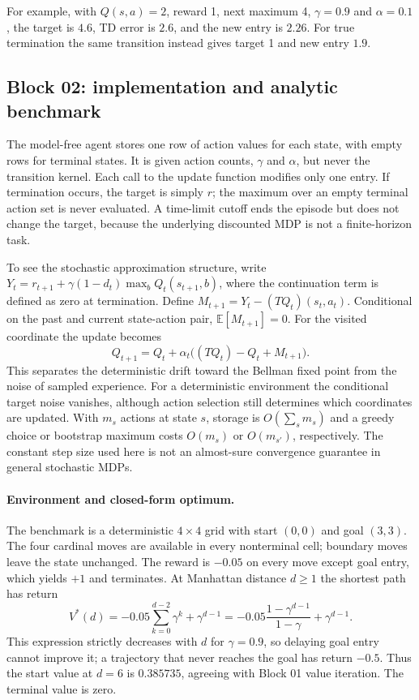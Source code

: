 \documentclass[11pt,a4paper]{article}
\newcommand{\E}{\mathbb E}
\begin{document}
For example, with $Q(s,a)=2$, reward 1, next maximum 4, $\gamma=0.9$ and $\alpha=0.1$, the target is $4.6$, TD error is $2.6$, and the new entry is $2.26$. For true termination the same transition instead gives target 1 and new entry $1.9$.

\subsection{Block 02: implementation and analytic benchmark}
The model-free agent stores one row of action values for each state, with empty rows for terminal states. It is given action counts, $\gamma$ and $\alpha$, but never the transition kernel. Each call to the update function modifies only one entry. If termination occurs, the target is simply $r$; the maximum over an empty terminal action set is never evaluated. A time-limit cutoff ends the episode but does not change the target, because the underlying discounted MDP is not a finite-horizon task.

To see the stochastic approximation structure, write $Y_t=r_{t+1}+\gamma(1-d_t)\max_b Q_t(s_{t+1},b)$, where the continuation term is defined as zero at termination. Define $M_{t+1}=Y_t-(TQ_t)(s_t,a_t)$. Conditional on the past and current state-action pair, $\E[M_{t+1}]=0$. For the visited coordinate the update becomes
\[
 Q_{t+1}=Q_t+\alpha_t\big((TQ_t)-Q_t+M_{t+1}\big).
\]
This separates the deterministic drift toward the Bellman fixed point from the noise of sampled experience. For a deterministic environment the conditional target noise vanishes, although action selection still determines which coordinates are updated. With $m_s$ actions at state $s$, storage is $O(\sum_s m_s)$ and a greedy choice or bootstrap maximum costs $O(m_s)$ or $O(m_{s'})$, respectively. The constant step size used here is not an almost-sure convergence guarantee in general stochastic MDPs.

\paragraph{Environment and closed-form optimum.} The benchmark is a deterministic $4\times4$ grid with start $(0,0)$ and goal $(3,3)$. The four cardinal moves are available in every nonterminal cell; boundary moves leave the state unchanged. The reward is $-0.05$ on every move except goal entry, which yields $+1$ and terminates. At Manhattan distance $d\geq1$ the shortest path has return
\[
 V^*(d)=-0.05\sum_{k=0}^{d-2}\gamma^k+\gamma^{d-1}
       =-0.05\frac{1-\gamma^{d-1}}{1-\gamma}+\gamma^{d-1}.
\]
This expression strictly decreases with $d$ for $\gamma=0.9$, so delaying goal entry cannot improve it; a trajectory that never reaches the goal has return $-0.5$. Thus the start value at $d=6$ is $0.385735$, agreeing with Block 01 value iteration. The terminal value is zero.
\end{document}
